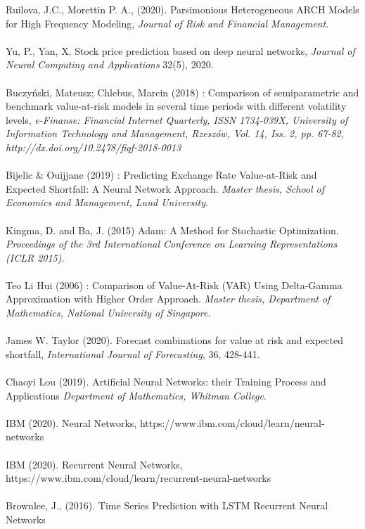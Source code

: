 \documentclass[a4paper,11pt,oneside]{book}
\begin{document}
Ruilova, J.C., Morettin P. A., (2020). Parsimonious Heterogeneous ARCH Models for High
Frequency Modeling, \textit{Journal of Risk and Financial Management}.\\\\
Yu, P., Yan, X. Stock price prediction based on deep neural networks, \textit{Journal of Neural Computing and Applications} 32(5), 2020.\\\\
Buczyński, Mateusz; Chlebus, Marcin (2018) : Comparison of semiparametric
and benchmark value-at-risk models in several time periods with different volatility
levels, \textit{e-Finanse: Financial Internet Quarterly, ISSN 1734-039X, University of Information
Technology and Management, Rzeszów, Vol. 14, Iss. 2, pp. 67-82,
http://dx.doi.org/10.2478/fiqf-2018-0013}\\\\
Bijelic \& Ouijjane (2019) : Predicting Exchange Rate
Value-at-Risk and Expected Shortfall:
A Neural Network Approach. \textit{Master thesis, School of Economics and Management, Lund University}.\\\\
Kingma, D. and Ba, J. (2015) Adam: A Method for Stochastic Optimization. \textit{Proceedings of the 3rd International Conference on Learning Representations (ICLR 2015)}.\\\\
Teo Li Hui (2006) : Comparison of Value-At-Risk (VAR) Using Delta-Gamma
Approximation with Higher Order Approach. \textit{Master thesis, Department of Mathematics, National University of Singapore}.\\\\
James W. Taylor (2020). Forecast combinations for value at risk and expected shortfall, \textit{International Journal of Forecasting}, 36, 428-441.\\\\
Chaoyi Lou (2019). Artificial Neural Networks:
their Training Process and Applications \textit{Department of Mathematics, Whitman College}.\\\\
IBM (2020). Neural Networks, https://www.ibm.com/cloud/learn/neural-networks\\\\
IBM (2020). Recurrent Neural Networks, https://www.ibm.com/cloud/learn/recurrent-neural-networks\\\\
Brownlee, J., (2016). Time Series Prediction with LSTM Recurrent Neural Networks
\end{document}
